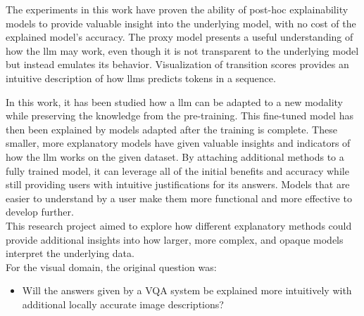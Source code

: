     The experiments in this work have proven the ability of post-hoc explainability models to provide valuable insight into the underlying model, with no cost of the explained model's accuracy. 
    The proxy model presents a useful understanding of how the \gls{llm} may work, even though it is not transparent to the underlying model but instead emulates its behavior. Visualization of transition scores provides an intuitive description of how \glspl{llm} predicts tokens in a sequence.  

    In this work, it has been studied how a \gls{llm} can be adapted to a new modality while preserving the knowledge from the pre-training.
    This fine-tuned model has then been explained by models adapted after the training is complete. These smaller, more explanatory models have given valuable insights and indicators of how the \gls{llm} works on the given dataset. 
    By attaching additional methods to a fully trained model, it can leverage all of the initial benefits and accuracy while still providing users with intuitive justifications for its answers. Models that are easier to understand by a user make them more functional and more effective to develop further.\\

   



    
This research project aimed to explore how different explanatory methods could provide additional insights into how larger, more complex, and opaque models interpret the underlying data.\\
For the visual domain, the original question was:
\begin{itemize}
    \item Will the answers given by a VQA system be explained more intuitively with additional locally accurate image descriptions?
\end{itemize}

